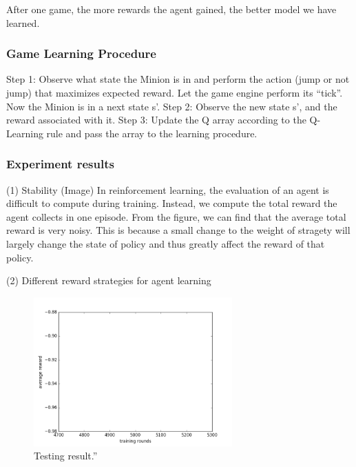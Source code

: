 \documentclass{acmsiggraph}
\begin{document}
After one game, the more rewards the agent gained, the better model we have learned.

\subsubsection{Game Learning Procedure}

Step 1: Observe what state the Minion is in and perform the action (jump or not jump) that maximizes expected reward. Let the game engine perform its “tick”. Now the Minion is in a next state s’.
Step 2: Observe the new state s’, and the reward associated with it.
Step 3: Update the Q array according to the Q-Learning rule and pass the array to the learning procedure.


\subsubsection{Experiment results}
(1) Stability (Image)
In reinforcement learning, the evaluation of an agent is difficult to compute during training. Instead, we compute the total reward the agent collects in one episode. From the figure, we can find that the average total reward is very noisy. This is because a small change to the weight of stragety will largely change the state of policy and thus greatly affect the reward of that policy. 

(2) Different reward strategies for agent learning





\begin{figure}[ht]
  \centering
  \includegraphics[width=3.0in]{../figures/testing.png}
  \caption{Testing result.''}
  \label{fig:result}
\end{figure}


\end{document}
